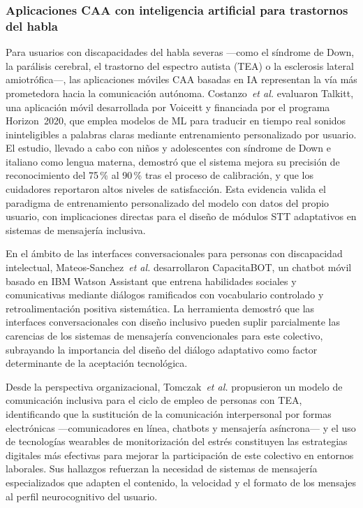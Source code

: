 \documentclass[journal]{IEEEtran}
\begin{document}
	\subsubsection{Aplicaciones CAA con inteligencia artificial para trastornos del habla}
	Para usuarios con discapacidades del habla severas ---como el s\'indrome de Down, la par\'alisis cerebral, el trastorno del espectro autista (TEA) o la esclerosis lateral amiotr\'ofica---, las aplicaciones m\'oviles CAA basadas en IA representan la v\'ia m\'as prometedora hacia la comunicaci\'on aut\'onoma. Costanzo~\textit{et al.} \cite{costanzo2023} evaluaron Talkitt, una aplicaci\'on m\'ovil desarrollada por Voiceitt y financiada por el programa Horizon~2020, que emplea modelos de ML para traducir en tiempo real sonidos ininteligibles a palabras claras mediante entrenamiento personalizado por usuario. El estudio, llevado a cabo con ni\~nos y adolescentes con s\'indrome de Down e italiano como lengua materna, demostr\'o que el sistema mejora su precisi\'on de reconocimiento del 75\,\% al 90\,\% tras el proceso de calibraci\'on, y que los cuidadores reportaron altos niveles de satisfacci\'on. Esta evidencia valida el paradigma de entrenamiento personalizado del modelo con datos del propio usuario, con implicaciones directas para el dise\~no de m\'odulos STT adaptativos en sistemas de mensajer\'ia inclusiva.
	
	En el \'ambito de las interfaces conversacionales para personas con discapacidad intelectual, Mateos-Sanchez~\textit{et al.} \cite{mateos2022} desarrollaron CapacitaBOT, un chatbot m\'ovil basado en IBM Watson Assistant que entrena habilidades sociales y comunicativas mediante di\'alogos ramificados con vocabulario controlado y retroalimentaci\'on positiva sistem\'atica. La herramienta demostr\'o que las interfaces conversacionales con dise\~no inclusivo pueden suplir parcialmente las carencias de los sistemas de mensajer\'ia convencionales para este colectivo, subrayando la importancia del dise\~no del di\'alogo adaptativo como factor determinante de la aceptaci\'on tecnol\'ogica.
	
	Desde la perspectiva organizacional, Tomczak~\textit{et al.} \cite{tomczak2021} propusieron un modelo de comunicaci\'on inclusiva para el ciclo de empleo de personas con TEA, identificando que la sustituci\'on de la comunicaci\'on interpersonal por formas electr\'onicas ---comunicadores en l\'inea, chatbots y mensajer\'ia as\'incrona--- y el uso de tecnolog\'ias wearables de monitorizaci\'on del estr\'es constituyen las estrategias digitales m\'as efectivas para mejorar la participaci\'on de este colectivo en entornos laborales. Sus hallazgos refuerzan la necesidad de sistemas de mensajer\'ia especializados que adapten el contenido, la velocidad y el formato de los mensajes al perfil neurocognitivo del usuario.
	
\end{document}
